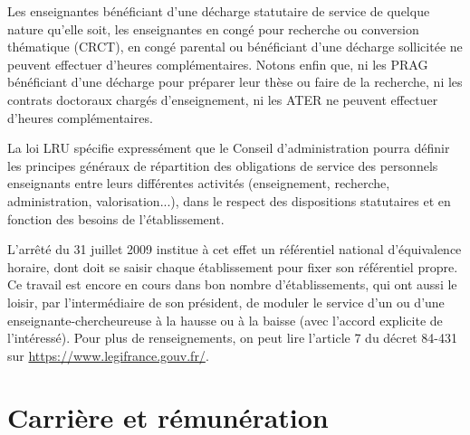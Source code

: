 
Les enseignant\mp e\mp s b\'en\'eficiant d'une d\'echarge statutaire de service de quelque
nature qu'elle soit, les enseignant\mp e\mp s en cong\'e pour recherche ou
conversion th\'ematique (CRCT), en cong\'e parental ou b\'en\'eficiant d'une
d\'echarge sollicit\'ee ne peuvent effectuer d'heures
compl\'ementaires. Notons enfin
que, ni les PRAG b\'en\'eficiant d'une d\'echarge pour
pr\'eparer leur th\`ese ou faire de la recherche,
ni les contrats doctoraux charg\'es d'enseignement,
ni les ATER ne peuvent effectuer d'heures compl\'ementaires.

La loi LRU sp\'ecifie express\'ement que le Conseil
d'administration pourra d\'efinir les principes g\'en\'eraux de
r\'epartition des obligations de service des personnels enseignants
entre leurs diff\'erentes activit\'es (enseignement, recherche,
administration, valorisation...), dans le respect des dispositions
statutaires et en fonction des besoins de l'\'etablissement.

\label{referentiel}
L'arr\^et\'e du 31 juillet 2009 institue \`a cet effet un r\'ef\'erentiel
national d'\'equivalence horaire, dont doit se saisir chaque \'etablissement
pour fixer son r\'ef\'erentiel propre. Ce travail est encore en cours dans bon nombre
d'\'etablissements, qui ont aussi le loisir, par l'interm\'ediaire de son pr\'esident,
de moduler le service d'un ou d'une enseignant\mp e-chercheur\mp euse \`a la hausse ou \`a la baisse (avec l'accord
explicite de l'int\'eress\'e). Pour plus de renseignements, on peut lire l'article 7 du d\'ecret 84-431 sur
\url{https://www.legifrance.gouv.fr/}.


\section{Carri\`ere et r\'emun\'eration}
\label{salairesEC}

